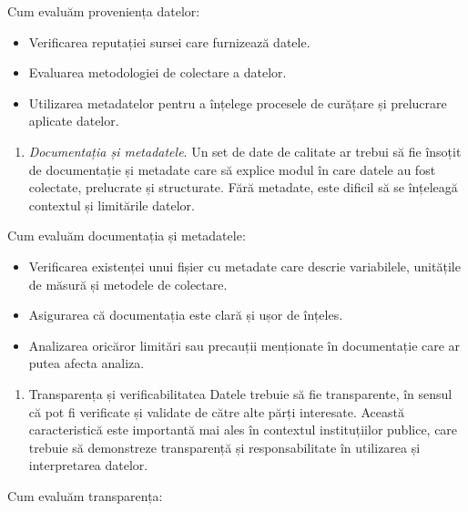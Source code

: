 \documentclass[
  11pt,
  b5paper,
  nottoc]{book}
\providecommand{\tightlist}{%
  \setlength{\itemsep}{0pt}\setlength{\parskip}{0pt}}\usepackage{longtable,booktabs,array}
\begin{document}
Cum evaluăm proveniența datelor:

\begin{itemize}
\tightlist
\item
  Verificarea reputației sursei care furnizează datele.\\
\item
  Evaluarea metodologiei de colectare a datelor.\\
\item
  Utilizarea metadatelor pentru a înțelege procesele de curățare și
  prelucrare aplicate datelor.
\end{itemize}

\begin{enumerate}
\def\labelenumi{\arabic{enumi}.}
\setcounter{enumi}{1}
\tightlist
\item
  \emph{Documentația și metadatele}. Un set de date de calitate ar
  trebui să fie însoțit de documentație și metadate care să explice
  modul în care datele au fost colectate, prelucrate și structurate.
  Fără metadate, este dificil să se înțeleagă contextul și limitările
  datelor.
\end{enumerate}

Cum evaluăm documentația și metadatele:

\begin{itemize}
\tightlist
\item
  Verificarea existenței unui fișier cu metadate care descrie
  variabilele, unitățile de măsură și metodele de colectare.\\
\item
  Asigurarea că documentația este clară și ușor de înțeles.\\
\item
  Analizarea oricăror limitări sau precauții menționate în documentație
  care ar putea afecta analiza.
\end{itemize}

\begin{enumerate}
\def\labelenumi{\arabic{enumi}.}
\setcounter{enumi}{2}
\tightlist
\item
  Transparența și verificabilitatea Datele trebuie să fie transparente,
  în sensul că pot fi verificate și validate de către alte părți
  interesate. Această caracteristică este importantă mai ales în
  contextul instituțiilor publice, care trebuie să demonstreze
  transparență și responsabilitate în utilizarea și interpretarea
  datelor.
\end{enumerate}

Cum evaluăm transparența:
\end{document}
